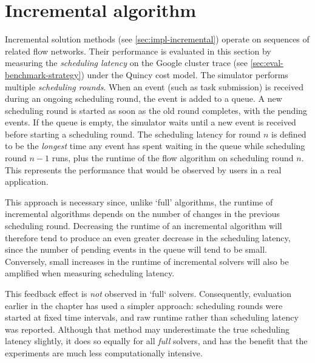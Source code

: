 \section{Incremental algorithm} \label{sec:eval-incremental}

Incremental solution methods (see \cref{sec:impl-incremental}) operate on sequences of related flow networks. Their performance is evaluated in this section by measuring the \emph{scheduling latency} on the Google cluster trace (see \cref{sec:eval-benchmark-strategy}) under the Quincy cost model. The simulator performs multiple \emph{scheduling rounds}. When an event (such as task submission) is received during an ongoing scheduling round, the event is added to a queue. A new scheduling round is started as soon as the old round completes, with the pending events. If the queue is empty, the simulator waits until a new event is received before starting a scheduling round. The scheduling latency for round $n$ is defined to be the \emph{longest} time any event has spent waiting in the queue while scheduling round $n-1$ runs, plus the runtime of the flow algorithm on scheduling round $n$. This represents the performance that would be observed by users in a real application.


This approach is necessary since, unlike `full' algorithms, the runtime of incremental algorithms depends on the number of changes in the previous scheduling round. Decreasing the runtime of an incremental algorithm will therefore tend to produce an even greater decrease in the scheduling latency, since the number of pending events in the queue will tend to be small. Conversely, small increases in the runtime of incremental solvers will also be amplified when measuring scheduling latency. 

This feedback effect is \emph{not} observed in `full` solvers. Consequently, evaluation earlier in the chapter has used a simpler approach: scheduling rounds were started at fixed time intervals, and raw runtime rather than scheduling latency was reported. Although that method may underestimate the true scheduling latency slightly\footnotemark, it does so equally for all \emph{full} solvers, and has the benefit that the experiments are much less computationally intensive.

